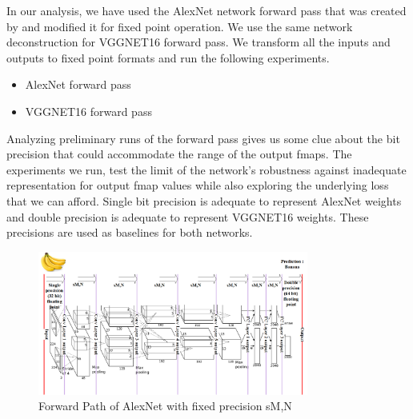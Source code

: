 \documentclass[conference]{IEEEtran}
\begin{document}
In our analysis, we have used the AlexNet network forward pass that was created by \cite{motamedi2016design, lepsucd} and modified it for fixed point operation. We use the same network deconstruction for VGGNET16 forward pass. 
We transform  all the inputs and outputs to fixed point formats and run  the following experiments. 
\begin{itemize}
\item AlexNet forward pass


\item VGGNET16 forward pass
\end{itemize}

Analyzing preliminary runs of the forward pass gives us some clue about the bit precision that could accommodate the range of the output fmaps. The experiments we run, test the limit of the network's robustness against inadequate representation for output fmap values while also exploring the underlying loss that we can afford. Single bit precision is adequate to represent AlexNet weights and double precision is adequate to represent VGGNET16 weights. These precisions are used as baselines for both networks. 
 \begin{figure}[!ht]
\centering
\includegraphics[width=3.5in]{fixedpt}
\caption{Forward Path of AlexNet with fixed precision sM,N}
\label{fp}
\end{figure}
\end{document}
